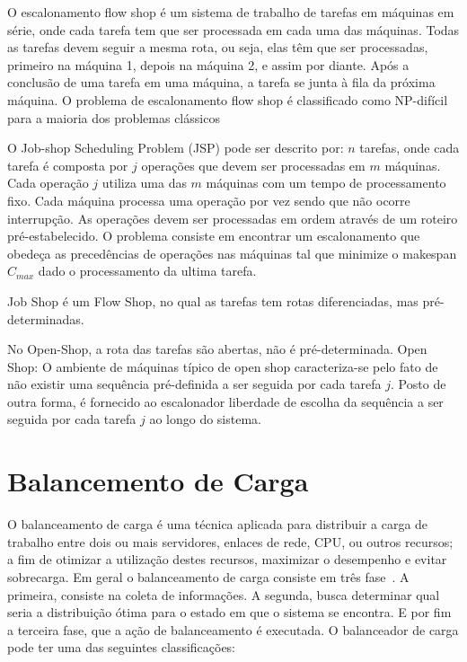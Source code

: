 O escalonamento flow shop é um sistema de trabalho de tarefas em máquinas em série, onde cada tarefa tem que ser processada em cada uma das máquinas. Todas as tarefas devem seguir a mesma rota, ou seja, elas têm que ser processadas, primeiro na máquina 1, depois na máquina 2, e assim por diante. Após a conclusão de uma tarefa em uma máquina, a tarefa se junta à fila da próxima máquina. O problema de escalonamento flow shop é classificado como NP-difícil para a maioria dos problemas clássicos

O Job-shop Scheduling Problem (JSP) pode ser descrito por: $n$ tarefas, onde cada tarefa é composta por $j$ operações que devem ser processadas em $m$ máquinas. Cada operação $j$ utiliza uma das $m$ máquinas com um tempo de processamento fixo. Cada máquina processa uma operação por vez sendo que não ocorre interrupção. As operações devem ser processadas em ordem através de um roteiro pré-estabelecido. O problema consiste em encontrar um escalonamento que obedeça as precedências de operações nas máquinas tal que minimize o makespan $C_{max}$ dado o processamento da ultima tarefa. 

Job Shop é um Flow Shop, no qual as tarefas tem rotas diferenciadas, mas pré-determinadas.

No Open-Shop, a rota das tarefas são abertas, não é pré-determinada. Open Shop: O ambiente de máquinas típico de open shop caracteriza-se pelo fato de não existir uma sequência pré-definida a ser seguida por cada tarefa $j$. Posto de outra forma, é fornecido ao escalonador liberdade de escolha da sequência a ser seguida por cada tarefa $j$ ao longo do sistema.


\section{Balancemento de Carga}\label{intro:carga}

O balanceamento de carga é uma técnica aplicada para distribuir a carga de trabalho entre dois ou mais servidores, enlaces de rede, CPU, ou outros recursos; a fim de otimizar a utilização destes recursos, maximizar o desempenho e evitar sobrecarga. Em geral o balanceamento de carga consiste em três fase~\cite{carga}. A primeira, consiste na coleta de informações. A segunda, busca determinar qual seria a distribuição ótima para o estado em que o sistema se encontra. E por fim a terceira fase, que a ação de balanceamento é executada. O balanceador de carga pode ter uma das seguintes classificações:


